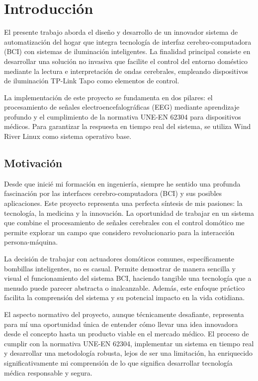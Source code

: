 \chapter{Introducción}

El presente trabajo aborda el diseño y desarrollo de un innovador sistema de automatización del hogar que integra tecnología de interfaz cerebro-computadora (BCI) con sistemas de iluminación inteligentes. La finalidad principal consiste en desarrollar una solución no invasiva que facilite el control del entorno doméstico mediante la lectura e interpretación de ondas cerebrales, empleando dispositivos de iluminación TP-Link Tapo como elementos de control.

La implementación de este proyecto se fundamenta en dos pilares: el procesamiento de señales electroencefalográficas (EEG) mediante aprendizaje profundo y el cumplimiento de la normativa UNE-EN 62304 para dispositivos médicos. Para garantizar la respuesta en tiempo real del sistema, se utiliza Wind River Linux como sistema operativo base.

\section{Motivación}
Desde que inicié mi formación en ingeniería, siempre he sentido una profunda fascinación por las interfaces cerebro-computadora (BCI) y sus posibles aplicaciones. Este proyecto representa una perfecta síntesis de mis pasiones: la tecnología, la medicina y la innovación. La oportunidad de trabajar en un sistema que combine el procesamiento de señales cerebrales con el control domótico me permite explorar un campo que considero revolucionario para la interacción persona-máquina.

La decisión de trabajar con actuadores domóticos comunes, específicamente bombillas inteligentes, no es casual. Permite demostrar de manera sencilla y visual el funcionamiento del sistema BCI, haciendo tangible una tecnología que a menudo puede parecer abstracta o inalcanzable. Además, este enfoque práctico facilita la comprensión del sistema y su potencial impacto en la vida cotidiana.

El aspecto normativo del proyecto, aunque técnicamente desafiante, representa para mí una oportunidad única de entender cómo llevar una idea innovadora desde el concepto hasta un producto viable en el mercado médico. El proceso de cumplir con la normativa UNE-EN 62304, implementar un sistema en tiempo real y desarrollar una metodología robusta, lejos de ser una limitación, ha enriquecido significativamente mi comprensión de lo que significa desarrollar tecnología médica responsable y segura.

